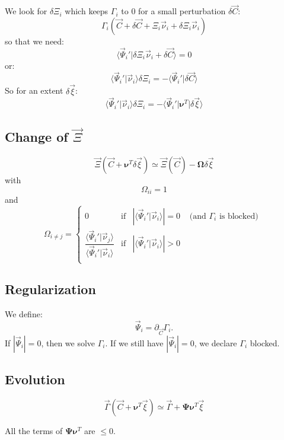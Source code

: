 \documentclass[aps,12pt]{revtex4}
\begin{document}
We look for $\delta \Xi_i$ which keeps $\Gamma_i$ to $0$ for a small perturbation $\delta\vec{C}$:
\begin{equation}
	\Gamma_i\left( \vec{C} + \delta\vec{C} + \Xi_i \vec{\nu}_i + \delta \Xi_i \vec{\nu}_i \right)
\end{equation}
so that we need:
\begin{equation}
	\langle \vec{\Psi}_i' \vert  \delta \Xi_i \vec{\nu}_i + \delta\vec{C} \rangle = 0
\end{equation}
or:
\begin{equation}
	\langle \vec{\Psi}_i' \vert  \vec{\nu}_i  \rangle  \delta \Xi_i = - \langle \vec{\Psi}_i' \vert \delta\vec{C} \rangle 
 \end{equation}
So for an extent $\delta\vec{\xi}$:
\begin{equation}
	\langle \vec{\Psi}_i' \vert  \vec{\nu}_i  \rangle  \delta \Xi_i = - \langle \vec{\Psi}_i' \vert \bm{\nu}^T \vert \delta\vec{\xi} \rangle 
\end{equation}

\subsection{Change of $\vec{\Xi}$}

\begin{equation}
	\vec{\Xi}(\vec{C}+ \bm{\nu}^T  \delta\vec{\xi} ) \simeq  \vec{\Xi}(\vec{C}) -
	\bm{\Omega}
	\delta\vec{\xi}
\end{equation}  
with
\begin{equation}
	\Omega_{ii} = 1
\end{equation}
and
\begin{equation}
\Omega_{i\not=j} = 
\left\lbrace
	\begin{array}{ccll}
	0 & \text{if} & |\langle \vec{\Psi}_i'  \vert \vec{\nu}_i \rangle| = 0 & \text{ (and $\Gamma_i$ is blocked) }\\
	\dfrac{\langle \vec{\Psi}_i'  \vert \vec{\nu}_j \rangle}{\langle \vec{\Psi}_i'  \vert \vec{\nu}_i \rangle}
	 & \text{if} & |\langle \vec{\Psi}_i'  \vert \vec{\nu}_i \rangle| > 0
	 & \\
	\end{array}
\right.
\end{equation}


 	 	
\subsection{Regularization}
We define:
\begin{equation}
\vec{\Psi}_i = \partial_{\vec{C}} \Gamma_i.
\end{equation}
If $|\vec{\Psi}_i|=0$, then we solve $\Gamma_i$. If we still have $|\vec{\Psi}_i|=0$, we declare $\Gamma_i$ blocked.

\subsection{Evolution}

\begin{equation}
	\vec{\Gamma}(\vec{C}+\bm{\nu}^T \vec{\xi}) \simeq \vec{\Gamma} + \bm{\Psi} \bm{\nu}^T \vec{\xi}
\end{equation}	

All the terms of $	\bm{\Psi} \bm{\nu}^T $ are $\leq 0$.




 


 
\end{document}
